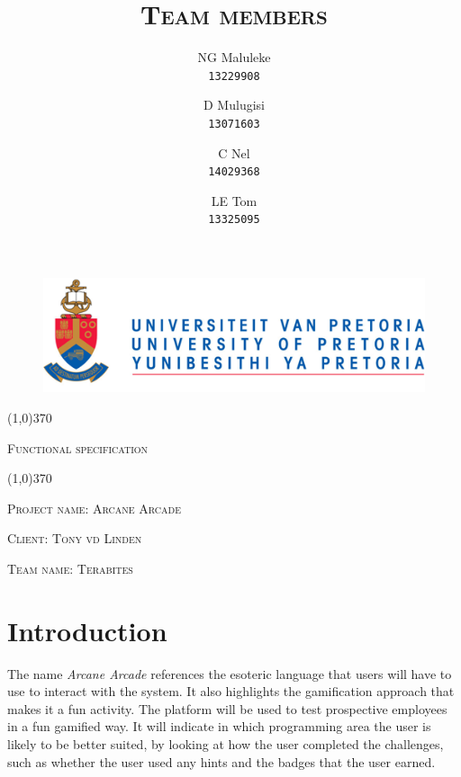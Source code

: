 \documentclass[english]{article}
\title{\scshape\Large Team members}
\author{
	NG Maluleke\\
	\texttt{13229908}
	\and
	D Mulugisi\\
	\texttt{13071603}
	\and
	C Nel\\
	\texttt{14029368}
	\and
	LE Tom\\
	\texttt{13325095}
}
\begin{document}
	
	\begin{figure}
		\includegraphics[width=\linewidth]{up_logo.png}
	\end{figure}
	
	\begin{center}
	 \line(1,0){370}
	\\[0.2cm]
    {\scshape\Large Functional specification \par}
	\vspace{0.1cm}
	\line(1,0){370}
	\\[0.8cm]
	
	{\scshape\large Project name: Arcane Arcade\par}	
	\vspace{1cm}
	{\scshape\large Client: Tony vd Linden\par}
	\vspace{1cm}
	{\scshape\large Team name: Terabites\par}
	\vspace{1cm}
	{\let\newpage\relax\maketitle}
	\end{center}
	
	
	\newpage
	\tableofcontents

	\newpage
	
	\section{Introduction}
		 The name \textit{Arcane Arcade} references the esoteric language that users will have to use to interact with the system. It also highlights the gamification approach that makes it a fun activity. The platform will be used to test prospective employees in a fun gamified way. It will indicate in which programming area the user is likely to be better suited, by looking at how the user completed the challenges, such as whether the user used any hints and the badges that the user earned.
\end{document}
